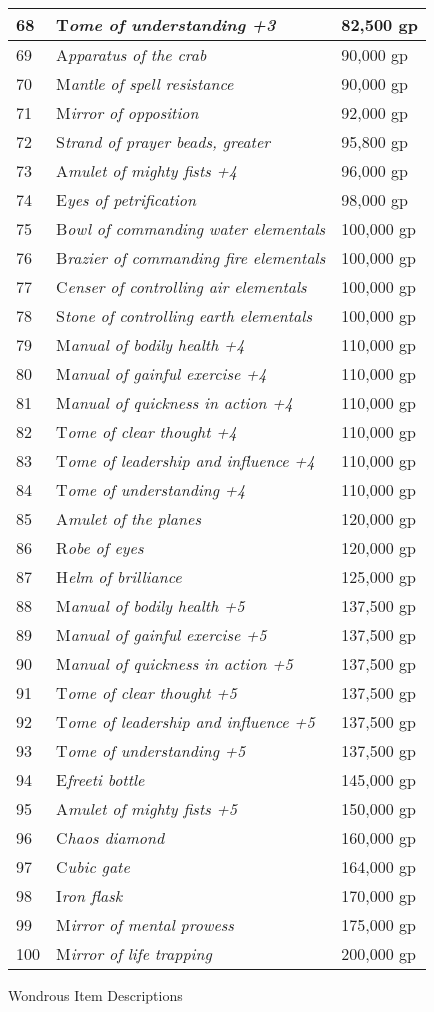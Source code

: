 \documentclass{article}
\begin{document}
\begin{tabular}{|>{\raggedright}p{14pt}|>{\raggedright}p{185pt}|>{\raggedright}p{55pt}|}
\hline
68 & T\textit{ome of understanding +3} & 82,500 gp\tabularnewline
\hline
69 & A\textit{pparatus of the crab} & 90,000 gp\tabularnewline
\hline
70 & M\textit{antle of spell resistance} & 90,000 gp\tabularnewline
\hline
71 & M\textit{irror of opposition} & 92,000 gp\tabularnewline
\hline
72 & S\textit{trand of prayer beads, greater} & 95,800 gp\tabularnewline
\hline
73 & A\textit{mulet of mighty fists +4} & 96,000 gp\tabularnewline
\hline
74 & E\textit{yes of petrification} & 98,000 gp\tabularnewline
\hline
75 & B\textit{owl of commanding water elementals} & 100,000 gp\tabularnewline
\hline
76 & B\textit{razier of commanding fire elementals} & 100,000 gp\tabularnewline
\hline
77 & C\textit{enser of controlling air elementals} & 100,000 gp\tabularnewline
\hline
78 & S\textit{tone of controlling earth elementals} & 100,000 gp\tabularnewline
\hline
79 & M\textit{anual of bodily health +4} & 110,000 gp\tabularnewline
\hline
80 & M\textit{anual of gainful exercise +4} & 110,000 gp\tabularnewline
\hline
81 & M\textit{anual of quickness in action +4} & 110,000 gp\tabularnewline
\hline
82 & T\textit{ome of clear thought +4} & 110,000 gp\tabularnewline
\hline
83 & T\textit{ome of leadership and influence +4} & 110,000 gp\tabularnewline
\hline
84 & T\textit{ome of understanding +4} & 110,000 gp\tabularnewline
\hline
85 & A\textit{mulet of the planes} & 120,000 gp\tabularnewline
\hline
86 & R\textit{obe of eyes} & 120,000 gp\tabularnewline
\hline
87 & H\textit{elm of brilliance} & 125,000 gp\tabularnewline
\hline
88 & M\textit{anual of bodily health +5} & 137,500 gp\tabularnewline
\hline
89 & M\textit{anual of gainful exercise +5} & 137,500 gp\tabularnewline
\hline
90 & M\textit{anual of quickness in action +5} & 137,500 gp\tabularnewline
\hline
91 & T\textit{ome of clear thought +5} & 137,500 gp\tabularnewline
\hline
92 & T\textit{ome of leadership and influence +5} & 137,500 gp\tabularnewline
\hline
93 & T\textit{ome of understanding +5} & 137,500 gp\tabularnewline
\hline
94 & E\textit{freeti bottle} & 145,000 gp\tabularnewline
\hline
95 & A\textit{mulet of mighty fists +5} & 150,000 gp\tabularnewline
\hline
96 & C\textit{haos diamond} & 160,000 gp\tabularnewline
\hline
97 & C\textit{ubic gate} & 164,000 gp\tabularnewline
\hline
98 & I\textit{ron flask} & 170,000 gp\tabularnewline
\hline
99 & M\textit{irror of mental prowess} & 175,000 gp\tabularnewline
\hline
100 & M\textit{irror of life trapping} & 200,000 gp\tabularnewline
\hline
\end{tabular}

\vspace{12pt}
Wondrous Item Descriptions
\end{document}
